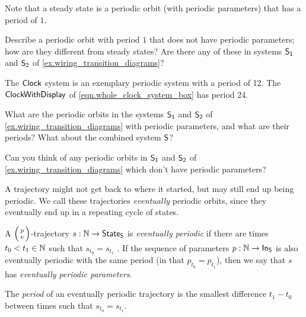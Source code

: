 \documentclass[DynamicalBook]{subfiles}
\begin{document}
\begin{remark}
  Note that a steady state is a periodic orbit (with periodic parameters) that has
  a period of $1$. 
\end{remark}

\begin{exercise}
Describe a periodic orbit with period $1$ that does not have periodic
parameters; how are they different from steady states? Are there any of these in systems $\mathsf{S_1}$ and $\mathsf{S_2}$ of \cref{ex.wiring_transition_diagrams}?
\end{exercise}

\begin{example}
  The $\mathsf{Clock}$ system is an exemplary periodic system with a period of 12.
  The $\mathsf{ClockWithDisplay}$ of \cref{eqn.whole_clock_system_box} has period 24.
\end{example}

\begin{exercise}\label{ex.wiring_transition_diagrams_periodic_orbits}
  What are the periodic orbits in the systems $\mathsf{S_1}$ and $\mathsf{S_2}$ of
  \cref{ex.wiring_transition_diagrams} with periodic parameters, and what are their periods? What about
  the combined system $\mathsf{S}$?
\end{exercise}

\begin{exercise}\label{ex.wiring_transition_diagrams_periodic_parameters}
  Can you think of any periodic orbits in $\mathsf{S_1}$ and $\mathsf{S_2}$ of
  \cref{ex.wiring_transition_diagrams} which
  don't have periodic parameters? 
\end{exercise}

A trajectory might not get back to where it started, but may still end up being
periodic. We call these trajectories \emph{eventually} periodic orbits, since
they eventually end up in a repeating cycle of states.

\begin{definition} \label{def.eventually_periodic_orbit_discrete}
A $\lens{p}{v}$-trajectory $s : \mathbb{N} \to
  \mathsf{State}_{\mathsf{S}}$ is \emph{eventually periodic} if there are times $t_0 < t_1 \in
  \mathbb{N}$ such that $s_{t_0} = s_{t_1}$ . If the sequence of
  parameters $p : \mathbb{N} \to \mathsf{In}_{\mathsf{S}}$ is also eventually periodic with the same period (in that $p_{t_0} = p_{t_1}$), then we say that $s$ has \emph{eventually periodic parameters}.

The \emph{period} of an eventually periodic trajectory is
  the smallest difference $t_1 - t_0$ between times such that $s_{t_0} = s_{t_1}$.
\end{definition}
\end{document}
